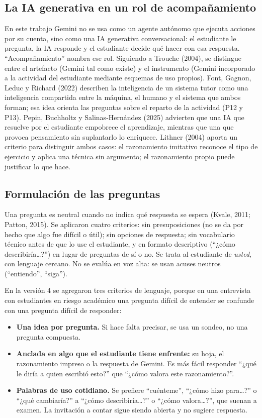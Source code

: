 \documentclass[11pt,letterpaper]{article}
\newcounter{preg}
\begin{document}
\subsection{La IA generativa en un rol de acompañamiento}
En este trabajo Gemini no se usa como un agente autónomo que ejecuta acciones por su cuenta, sino como una IA generativa conversacional: el estudiante le pregunta, la IA responde y el estudiante decide qué hacer con esa respuesta. ``Acompañamiento'' nombra ese rol. Siguiendo a Trouche (2004), se distingue entre el artefacto (Gemini tal como existe) y el instrumento (Gemini incorporado a la actividad del estudiante mediante esquemas de uso propios). Font, Gagnon, Leduc y Richard (2022) describen la inteligencia de un sistema tutor como una inteligencia compartida entre la máquina, el humano y el sistema que ambos forman; esa idea orienta las preguntas sobre el reparto de la actividad (P12 y P13). Pepin, Buchholtz y Salinas-Hernández (2025) advierten que una IA que resuelve por el estudiante empobrece el aprendizaje, mientras que una que provoca pensamiento sin suplantarlo lo enriquece. Lithner (2004) aporta un criterio para distinguir ambos casos: el razonamiento imitativo reconoce el tipo de ejercicio y aplica una técnica sin argumento; el razonamiento propio puede justificar lo que hace.

\subsection{Formulación de las preguntas}\label{sec:neutralidad}
Una pregunta es neutral cuando no indica qué respuesta se espera (Kvale, 2011; Patton, 2015). Se aplicaron cuatro criterios: sin presuposiciones (no se da por hecho que algo fue difícil o útil); sin opciones de respuesta; sin vocabulario técnico antes de que lo use el estudiante, y en formato descriptivo (``¿cómo describiría\ldots?'') en lugar de preguntas de sí o no. Se trata al estudiante de \emph{usted}, con lenguaje cercano. No se evalúa en voz alta: se usan acuses neutros (``entiendo'', ``siga'').

En la versión 4 se agregaron tres criterios de lenguaje, porque en una entrevista con estudiantes en riesgo académico una pregunta difícil de entender se confunde con una pregunta difícil de responder:
\begin{itemize}
  \item \textbf{Una idea por pregunta.} Si hace falta precisar, se usa un sondeo, no una pregunta compuesta.
  \item \textbf{Anclada en algo que el estudiante tiene enfrente:} su hoja, el razonamiento impreso o la respuesta de Gemini. Es más fácil responder ``¿qué le diría a quien escribió esto?'' que ``¿cómo valora este razonamiento?''.
  \item \textbf{Palabras de uso cotidiano.} Se prefiere ``cuénteme'', ``¿cómo hizo para\ldots?'' o ``¿qué cambiaría?'' a ``¿cómo describiría\ldots?'' o ``¿cómo valora\ldots?'', que suenan a examen. La invitación a contar sigue siendo abierta y no sugiere respuesta.
\end{itemize}
\end{document}
